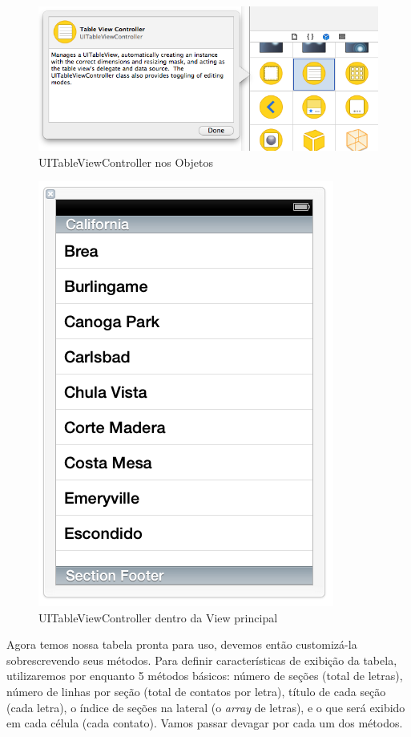 \documentclass[a4paper,12pt,brazil,doubleside]{book}
\begin{document}
\begin{figure}[h]
  \centering
  \includegraphics[totalheight=0.2\textheight]{figuras/table/table8.png}
  \caption{UITableViewController nos Objetos}
  \label{fig:a}
\end{figure}

\pagebreak

\begin{figure}[h]
  \centering
  \includegraphics[totalheight=0.5\textheight]{figuras/table/table9.png}
  \caption{UITableViewController dentro da View principal}
  \label{fig:a}
\end{figure}

Agora temos nossa tabela pronta para uso, devemos então customizá-la sobrescrevendo seus métodos. Para definir características de exibição da tabela, utilizaremos por enquanto 5 métodos básicos: número de seções (total de letras), número de linhas por seção (total de contatos por letra), título de cada seção (cada letra), o índice de seções na lateral (o \emph{array} de letras), e o que será exibido em cada célula (cada contato). Vamos passar devagar por cada um dos métodos.
\end{document}
